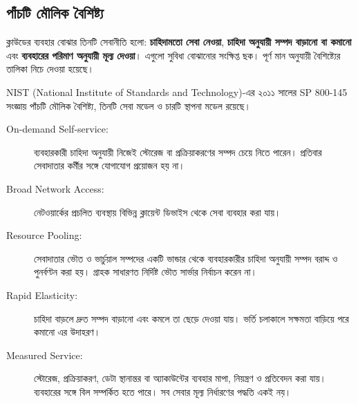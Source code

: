 \subsection{পাঁচটি মৌলিক বৈশিষ্ট্য}
\label{ch2:c10-02}
ক্লাউডের ব্যবহার বোঝার তিনটি সেবানীতি হলো: \textbf{চাহিদামতো সেবা নেওয়া}, \textbf{চাহিদা অনুযায়ী সম্পদ বাড়ানো বা কমানো} এবং \textbf{ব্যবহারের পরিমাণ অনুযায়ী মূল্য দেওয়া}। এগুলো সুবিধা বোঝানোর সংক্ষিপ্ত ছক। পূর্ণ মান অনুযায়ী বৈশিষ্ট্যের তালিকা নিচে দেওয়া হয়েছে।

NIST (National Institute of Standards and Technology)-এর ২০১১ সালের SP 800-145 সংজ্ঞায় পাঁচটি মৌলিক বৈশিষ্ট্য, তিনটি সেবা মডেল ও চারটি স্থাপনা মডেল রয়েছে।
\begin{description}
\item[On-demand Self-service:] ব্যবহারকারী চাহিদা অনুযায়ী নিজেই স্টোরেজ বা প্রক্রিয়াকরণের সম্পদ চেয়ে নিতে পারেন। প্রতিবার সেবাদাতার কর্মীর সঙ্গে যোগাযোগ প্রয়োজন হয় না।
\item[Broad Network Access:] নেটওয়ার্কের প্রচলিত ব্যবস্থায় বিভিন্ন ক্লায়েন্ট ডিভাইস থেকে সেবা ব্যবহার করা যায়।
\item[Resource Pooling:] সেবাদাতার ভৌত ও ভার্চুয়াল সম্পদের একটি ভান্ডার থেকে ব্যবহারকারীর চাহিদা অনুযায়ী সম্পদ বরাদ্দ ও পুনর্বণ্টন করা হয়। গ্রাহক সাধারণত নির্দিষ্ট ভৌত সার্ভার নির্বাচন করেন না।
\item[Rapid Elasticity:] চাহিদা বাড়লে দ্রুত সম্পদ বাড়ানো এবং কমলে তা ছেড়ে দেওয়া যায়। ভর্তি চলাকালে সক্ষমতা বাড়িয়ে পরে কমানো এর উদাহরণ।
\item[Measured Service:] স্টোরেজ, প্রক্রিয়াকরণ, ডেটা স্থানান্তর বা অ্যাকাউন্টের ব্যবহার মাপা, নিয়ন্ত্রণ ও প্রতিবেদন করা যায়। ব্যবহারের সঙ্গে বিল সম্পর্কিত হতে পারে। সব সেবার মূল্য নির্ধারণের পদ্ধতি একই নয়।
\end{description}

